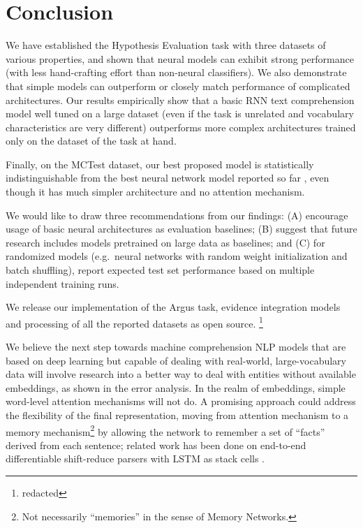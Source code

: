 \documentclass[11pt]{article}
\begin{document}



\section{Conclusion}
\label{sec:concl}

We have established the Hypothesis Evaluation task with three datasets
of various properties, and shown that neural models can exhibit strong
performance (with less hand-crafting effort than non-neural classifiers).
We also demonstrate that simple models can outperform or closely match
performance of complicated architectures.
Our results empirically show that a basic RNN text comprehension model
well tuned on a large dataset (even if the task is unrelated and vocabulary
characteristics are very different) outperforms more complex architectures
trained only on the dataset of the task at hand.

Finally, on the MCTest dataset, our best proposed model is statistically
indistinguishable from the best neural network model reported so far
\cite{HABCNN},
even though it has much simpler architecture and no attention mechanism.

We would like to draw three recommendations from our findings:
(A) encourage usage of basic neural architectures as evaluation baselines;
(B) suggest that future research includes models pretrained on large data as
baselines; and
(C) for randomized models (e.g.\ neural networks with random weight
initialization and batch shuffling), report expected test set performance
based on multiple independent training runs.

We release our implementation of the Argus task, evidence integration
models and processing of all the reported datasets as open source.%
\footnote{redacted}

We believe the next step towards machine comprehension NLP models
that are based on deep learning but capable of dealing with real-world,
large-vocabulary data will involve research into a better way to deal with
entities without available embeddings, as shown in the error analysis.
In the realm of embeddings, simple word-level attention mechanisms will not do.
A promising approach could address
the flexibility of the final representation, moving from attention mechanism
to a memory mechanism\footnote{Not necessarily ``memories'' in the sense of Memory Networks.}
by allowing the network to remember a set of ``facts'' derived from each sentence;
related work has been done on end-to-end differentiable shift-reduce parsers
with LSTM as stack cells \cite{EndToEndParsing}.
\end{document}
